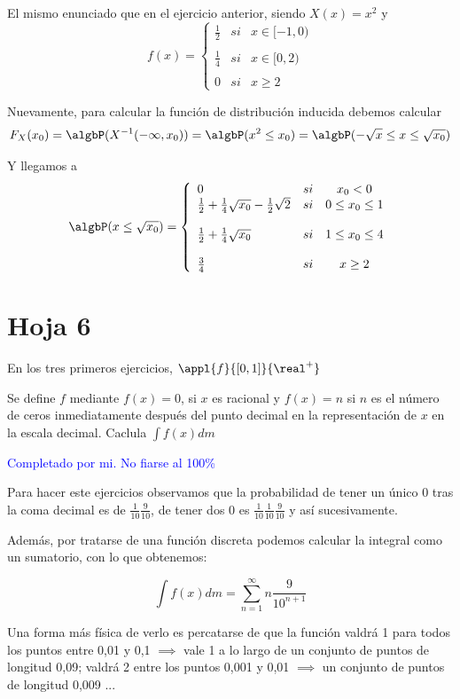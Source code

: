 \begin{problem}[9]
El mismo enunciado que en el ejercicio anterior, siendo $X(x)=x^2$ y
\[
f(x)= \left\{ \begin{array}{lcc}
             \frac{1}{2} &   si  & x \in  [-1, 0) \\
             \\ \frac{1}{4} & si & x \in [0,2) \\
             \\ 0 &  si & x \geq 2
             \end{array}
   \right.
\]

\solution

Nuevamente, para calcular la función de distribución inducida debemos calcular
\[F_X(x_0) = \algbP(X^{-1}(-\infty, x_0)) = \algbP (x^2 \leq x_0) = \algbP (-\sqrt{x} \leq x \leq \sqrt{x_0})\]

Y llegamos a
\[
\algbP (x \leq \sqrt{x_0})= \left\{ \begin{array}{lcc}
				0 & si & x_0 < 0
			 \\ \frac{1}{2} + \frac{1}{4}\sqrt{x_0} - \frac{1}{2}\sqrt{2} & si & 0 \leq x_0 \leq 1 \\
             \\ \frac{1}{2} + \frac{1}{4}\sqrt{x_0} & si & 1 \leq x_0 \leq 4 \\
             \\ \frac{3}{4} &  si & x \geq 2
             \end{array}
   \right.
\]
\end{problem}

\section{Hoja 6}
En los tres primeros ejercicios, $\appl{f}{[0,1]}{\real^+}$

\begin{problem}[1]
Se define $f$ mediante $f(x) = 0 $, si $x$ es racional y $f(x)=n$ si $n$ es el número de ceros inmediatamente después del punto decimal en la representación de $x$ en la escala decimal. Caclula $\int f(x) dm$

\solution

\textcolor{blue}{Completado por mi. No fiarse al 100\%}

Para hacer este ejercicios observamos que la probabilidad de tener un único 0 tras la coma decimal es de $\frac{1}{10}\frac{9}{10}$, de tener dos 0 es $\frac{1}{10}\frac{1}{10}\frac{9}{10}$ y así sucesivamente.

Además, por tratarse de una función discreta podemos calcular la integral como un sumatorio, con lo que obtenemos:

\[\int f(x) dm = \sum_{n=1}^{\infty} n \frac{9}{10^{n+1}}\]

Una forma más física de verlo es percatarse de que la función valdrá 1 para todos los puntos entre 0,01 y 0,1 $\implies$ vale 1 a lo largo de un conjunto de puntos de longitud 0,09; valdrá 2 entre los puntos 0,001 y 0,01 $\implies$ un conjunto de puntos de longitud 0,009 ...

\end{problem}

